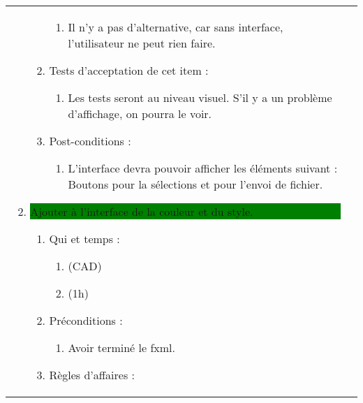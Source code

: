 \begin{longtable}{|l|p{}|}
\begin{enumerate}[label*=\arabic*.]
\begin{enumerate}[label*=\arabic*.]
\begin{enumerate}[label*=\arabic*.]
                                    \item Il n'y a pas d'alternative, car sans interface, l'utilisateur ne peut rien faire.
                                \end{enumerate}
                                \item Tests d'acceptation de cet item :
                                \begin{enumerate}[label*=\arabic*.]
                                    \item Les tests seront au niveau visuel. S'il y a un problème d'affichage, on pourra le voir.
                                \end{enumerate}
                                \item Post-conditions :
                                \begin{enumerate}[label*=\arabic*.]
                                    \item L'interface devra pouvoir afficher les éléments suivant : Boutons pour la sélections et pour l'envoi de fichier.
                                \end{enumerate}
                            \end{enumerate}
             \item \colorbox{Green}{\parbox{13cm}{ Ajouter à l’interface de la couleur et du style.}}
                \begin{enumerate}[label*=\arabic*.]
                                \item Qui et temps :
                                \begin{enumerate}[label*=\arabic*.]
                                    \item (CAD)
                                    \item (1h)
                                \end{enumerate}
                                \item Préconditions :
                                \begin{enumerate}[label*=\arabic*.]
                                    \item Avoir terminé le fxml.
                                \end{enumerate}
                                \item Règles d'affaires :
                                \begin{enumerate}[label*=\arabic*.]

\end{enumerate}
\end{enumerate}
\end{enumerate}
\end{longtable}
